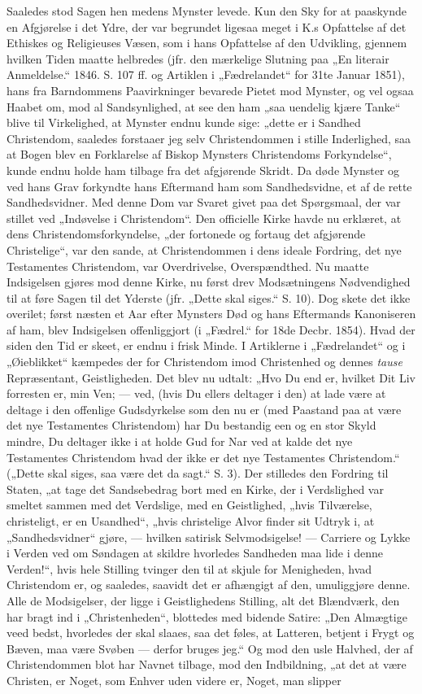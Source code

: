 \documentclass[12pt,a4paper]{book}
\begin{document}
Saaledes stod Sagen hen medens Mynster levede. Kun den Sky for at paaskynde en Afgjørelse i det Ydre, der var begrundet ligesaa meget i K.s Opfattelse af det Ethiskes og Religieuses Væsen, som i hans Opfattelse af den Udvikling, gjennem hvilken Tiden maatte helbredes (jfr. den mærkelige Slutning paa „En literair Anmeldelse.“ 1846. S. 107 ff. og Artiklen i „Fædrelandet“ for 31te Januar 1851), hans fra Barndommens Paavirkninger bevarede Pietet mod Mynster, og vel ogsaa Haabet om, mod al Sandsynlighed, at see den ham „saa uendelig kjære Tanke“ blive til Virkelighed, at Mynster endnu kunde sige: „dette er i Sandhed Christendom, saaledes forstaaer jeg selv Christendommen i stille Inderlighed, saa at Bogen blev en Forklarelse af Biskop Mynsters Christendoms Forkyndelse“, kunde endnu holde ham tilbage fra det afgjørende Skridt. Da døde Mynster og ved hans Grav forkyndte hans Eftermand ham som Sandhedsvidne, et af de rette Sandhedsvidner. Med denne Dom var Svaret givet paa det Spørgsmaal, der var stillet ved „Indøvelse i Christendom“. Den officielle Kirke havde nu erklæret, at dens Christendomsforkyndelse, „der fortonede og fortaug det afgjørende Christelige“, var den sande, at Christendommen i dens ideale Fordring, det nye Testamentes Christendom, var Overdrivelse, Overspændthed. Nu maatte Indsigelsen gjøres mod denne Kirke, nu først drev Modsætningens Nødvendighed til at føre Sagen til det Yderste (jfr. „Dette skal siges.“ S. 10). Dog skete det ikke overilet; først næsten et Aar efter Mynsters Død og hans Eftermands Kanoniseren af ham, blev Indsigelsen offenliggjort (i „Fædrel.“ for 18de Decbr. 1854). Hvad der siden den Tid er skeet, er endnu i frisk Minde. I Artiklerne i „Fædrelandet“ og i „Øieblikket“ kæmpedes der for Christendom imod Christenhed og dennes \emph{tause} Repræsentant, Geistligheden. Det blev nu udtalt: „Hvo Du end er, hvilket Dit Liv forresten er, min Ven; --- ved, (hvis Du ellers deltager i den) at lade være at deltage i den offenlige Gudsdyrkelse som den nu er (med Paastand paa at være det nye Testamentes Christendom) har Du bestandig een og en stor Skyld mindre, Du deltager ikke i at holde Gud for Nar ved at kalde det nye Testamentes Christendom hvad der ikke er det nye Testamentes Christendom.“ („Dette skal siges, saa være det da sagt.“ S. 3). Der stilledes den Fordring til Staten, „at tage det Sandsebedrag bort med en Kirke, der i Verdslighed var smeltet sammen med det Verdslige, med en Geistlighed, „hvis Tilværelse, christeligt, er en Usandhed“, „hvis christelige Alvor finder sit Udtryk i, at „Sandhedsvidner“ gjøre, --- hvilken satirisk Selvmodsigelse! --- Carriere og Lykke i Verden ved om Søndagen at skildre hvorledes Sandheden maa lide i denne Verden!“, hvis hele Stilling tvinger den til at skjule for Menigheden, hvad Christendom er, og saaledes, saavidt det er afhængigt af den, umuliggjøre denne. Alle de Modsigelser, der ligge i Geistlighedens Stilling, alt det Blændværk, den har bragt ind i „Christenheden“, blottedes med bidende Satire: „Den Almægtige veed bedst, hvorledes der skal slaaes, saa det føles, at Latteren, betjent i Frygt og Bæven, maa være Svøben --- derfor bruges jeg.“ Og mod den usle Halvhed, der af Christendommen blot har Navnet tilbage, mod den Indbildning, „at det at være Christen, er Noget, som Enhver uden videre er, Noget, man slipper 
\end{document}
